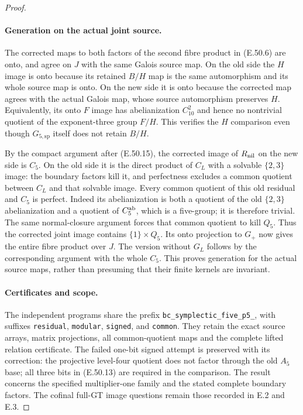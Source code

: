 \begin{proof}
\paragraph{Generation on the actual joint source.}
The corrected maps to both factors of
the second fibre product in
\textup{(E.50.6)} are onto, and agree
on $J$ with the same Galois source map.
On the old side the $H$ image is onto
because its retained $B/H$ map is the
same automorphism and its whole source
map is onto.  On the new side it is onto
because the corrected map agrees with
the actual Galois map, whose source
automorphism preserves $H$.
Equivalently, its onto $F$ image has
abelianization $C_{10}^2$ and hence no
nontrivial quotient of the exponent-three
group $F/H$.
This verifies the $H$ comparison even
though $G_{5,\mathrm{sp}}$ itself does
not retain $B/H$.

By the compact argument after
\textup{(E.50.15)}, the corrected image
of $R_{\rm nil}$ on the new side is
$C_5$.  On the old side it is the direct
product of $C_L$ with a solvable
$\{2,3\}$ image: the boundary factors
kill it, and perfectness excludes a
common quotient between $C_L$ and
that solvable image.
Every common quotient of this old
residual and $C_5$ is perfect.  Indeed
its abelianization is both a quotient
of the old $\{2,3\}$ abelianization
and a quotient of $C_5^{\rm ab}$,
which is a five-group; it is therefore
trivial.  The same normal-closure
argument forces that common quotient
to kill $Q_5$.
Thus the corrected joint image contains
$\{1\}\times Q_5$.
Its onto projection to $G_+$ now gives
the entire fibre product over $J$.
The version without $G_L$ follows by
the corresponding argument with the
whole $C_5$.
This proves generation for the actual
source maps, rather than presuming
that their finite kernels are invariant.

\paragraph{Certificates and scope.}
The independent programs share the prefix
\texttt{bc\_symplectic\_five\_p5\_}, with
suffixes \texttt{residual}, \texttt{modular},
\texttt{signed}, and \texttt{common}.
They retain the exact source arrays,
matrix projections, all common-quotient
maps and the complete lifted relation
certificate.  The failed one-bit signed
attempt is preserved with its correction:
the projective level-four quotient does
not factor through the old $A_5$ base;
all three bits in \textup{(E.50.13)}
are required in the comparison.
The result concerns the specified
multiplier-one family and the stated
complete boundary factors.  The cofinal
full-GT image questions remain those
recorded in E.2 and E.3.
\end{proof}
